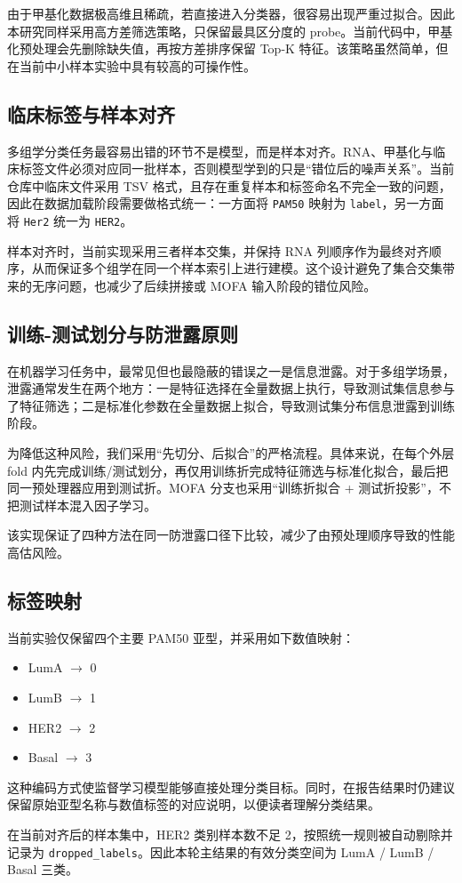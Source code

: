 由于甲基化数据极高维且稀疏，若直接进入分类器，很容易出现严重过拟合。因此本研究同样采用高方差筛选策略，只保留最具区分度的 probe。当前代码中，甲基化预处理会先删除缺失值，再按方差排序保留 Top-K 特征。该策略虽然简单，但在当前中小样本实验中具有较高的可操作性。

\subsection{临床标签与样本对齐}

多组学分类任务最容易出错的环节不是模型，而是样本对齐。RNA、甲基化与临床标签文件必须对应同一批样本，否则模型学到的只是“错位后的噪声关系”。当前仓库中临床文件采用 TSV 格式，且存在重复样本和标签命名不完全一致的问题，因此在数据加载阶段需要做格式统一：一方面将 \texttt{PAM50} 映射为 \texttt{label}，另一方面将 \texttt{Her2} 统一为 \texttt{HER2}。

样本对齐时，当前实现采用三者样本交集，并保持 RNA 列顺序作为最终对齐顺序，从而保证多个组学在同一个样本索引上进行建模。这个设计避免了集合交集带来的无序问题，也减少了后续拼接或 MOFA 输入阶段的错位风险。

\subsection{训练-测试划分与防泄露原则}

在机器学习任务中，最常见但也最隐蔽的错误之一是信息泄露。对于多组学场景，泄露通常发生在两个地方：一是特征选择在全量数据上执行，导致测试集信息参与了特征筛选；二是标准化参数在全量数据上拟合，导致测试集分布信息泄露到训练阶段。

为降低这种风险，我们采用“先切分、后拟合”的严格流程。具体来说，在每个外层 fold 内先完成训练/测试划分，再仅用训练折完成特征筛选与标准化拟合，最后把同一预处理器应用到测试折。MOFA 分支也采用“训练折拟合 + 测试折投影”，不把测试样本混入因子学习。

该实现保证了四种方法在同一防泄露口径下比较，减少了由预处理顺序导致的性能高估风险。

\subsection{标签映射}

当前实验仅保留四个主要 PAM50 亚型，并采用如下数值映射：
\begin{itemize}
  \item LumA $\rightarrow$ 0
  \item LumB $\rightarrow$ 1
  \item HER2 $\rightarrow$ 2
  \item Basal $\rightarrow$ 3
\end{itemize}

这种编码方式使监督学习模型能够直接处理分类目标。同时，在报告结果时仍建议保留原始亚型名称与数值标签的对应说明，以便读者理解分类结果。

在当前对齐后的样本集中，HER2 类别样本数不足 2，按照统一规则被自动剔除并记录为 \texttt{dropped\_labels}。因此本轮主结果的有效分类空间为 LumA / LumB / Basal 三类。
